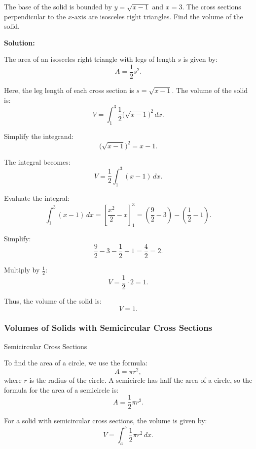 \documentclass[12pt]{article}
\theoremstyle{beautifulthm}
\begin{document}
\begin{tcolorbox}[colback=examplebg, colframe=red!75!black, title=\textbf{EXAMPLE 1: Isosceles Right Triangle}, fonttitle=\bfseries, sharp corners]
The base of the solid is bounded by $y = \sqrt{x - 1}$ and $x = 3$. The cross sections perpendicular to the $x$-axis are isosceles right triangles. Find the volume of the solid.


\tcblower
\textbf{Solution:} 

The area of an isosceles right triangle with legs of length $s$ is given by:
\[
A = \frac{1}{2}s^2.
\]

Here, the leg length of each cross section is $s = \sqrt{x - 1}$. The volume of the solid is:
\[
V = \int_1^3 \frac{1}{2} \big(\sqrt{x - 1}\big)^2 \, dx.
\]

Simplify the integrand:
\[
\big(\sqrt{x - 1}\big)^2 = x - 1.
\]

The integral becomes:
\[
V = \frac{1}{2} \int_1^3 (x - 1) \, dx.
\]

Evaluate the integral:
\[
\int_1^3 (x - 1) \, dx = \left[\frac{x^2}{2} - x\right]_1^3 = \left(\frac{9}{2} - 3\right) - \left(\frac{1}{2} - 1\right).
\]

Simplify:
\[
\frac{9}{2} - 3 - \frac{1}{2} + 1 = \frac{4}{2} = 2.
\]

Multiply by $\frac{1}{2}$:
\[
V = \frac{1}{2} \cdot 2 = 1.
\]

Thus, the volume of the solid is:
\[
V = 1.
\]
\end{tcolorbox}


\subsubsection{Volumes of Solids with Semicircular Cross Sections}
\begin{mytheorem}{Semicircular Cross Sections}{}
    
To find the area of a circle, we use the formula:
\[
A = \pi r^2,
\]
where $r$ is the radius of the circle. A semicircle has half the area of a circle, so the formula for the area of a semicircle is:
\[
A = \frac{1}{2} \pi r^2.
\]

For a solid with semicircular cross sections, the volume is given by:
\[
V = \int_a^b \frac{1}{2} \pi r^2 \, dx.
\]
\end{mytheorem}
\end{document}
